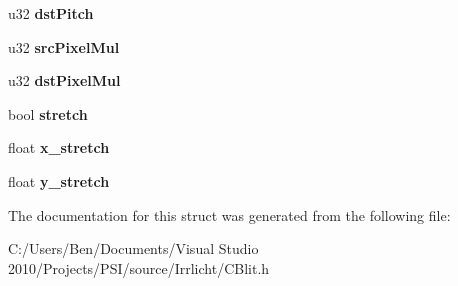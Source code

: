\begin{DoxyCompactItemize}
\item 
\hypertarget{structirr_1_1_s_blit_job_a35fbc2c933569a5634ac9d440501b223}{u32 {\bfseries dst\-Pitch}}\label{structirr_1_1_s_blit_job_a35fbc2c933569a5634ac9d440501b223}

\item 
\hypertarget{structirr_1_1_s_blit_job_aefd6647bccda9509d372447cc8047a00}{u32 {\bfseries src\-Pixel\-Mul}}\label{structirr_1_1_s_blit_job_aefd6647bccda9509d372447cc8047a00}

\item 
\hypertarget{structirr_1_1_s_blit_job_aa5fe492d505275cf09f77f57a00a1e1a}{u32 {\bfseries dst\-Pixel\-Mul}}\label{structirr_1_1_s_blit_job_aa5fe492d505275cf09f77f57a00a1e1a}

\item 
\hypertarget{structirr_1_1_s_blit_job_a0451470ec5119ba19b81a4a8382b26b5}{bool {\bfseries stretch}}\label{structirr_1_1_s_blit_job_a0451470ec5119ba19b81a4a8382b26b5}

\item 
\hypertarget{structirr_1_1_s_blit_job_af28067c6d7465250799087d58fc57d44}{float {\bfseries x\-\_\-stretch}}\label{structirr_1_1_s_blit_job_af28067c6d7465250799087d58fc57d44}

\item 
\hypertarget{structirr_1_1_s_blit_job_aa9a7b7adf228a167c9922be8c345ddb6}{float {\bfseries y\-\_\-stretch}}\label{structirr_1_1_s_blit_job_aa9a7b7adf228a167c9922be8c345ddb6}

\end{DoxyCompactItemize}


The documentation for this struct was generated from the following file\-:\begin{DoxyCompactItemize}
\item 
C\-:/\-Users/\-Ben/\-Documents/\-Visual Studio 2010/\-Projects/\-P\-S\-I/source/\-Irrlicht/C\-Blit.\-h\end{DoxyCompactItemize}

